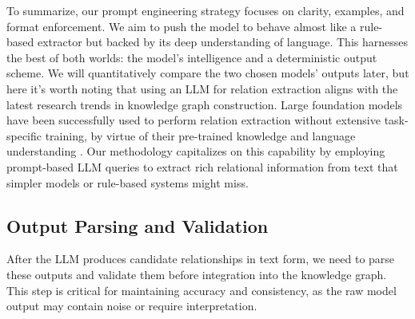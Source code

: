 To summarize, our prompt engineering strategy focuses on clarity, examples, and format enforcement. We aim to push the model to behave almost like a rule-based extractor but backed by its deep understanding of language. This harnesses the best of both worlds: the model's intelligence and a deterministic output scheme. We will quantitatively compare the two chosen models' outputs later, but here it's worth noting that using an LLM for relation extraction aligns with the latest research trends in knowledge graph construction. Large foundation models have been successfully used to perform relation extraction without extensive task-specific training, by virtue of their pre-trained knowledge and language understanding \parencite{Singhal2022}. Our methodology capitalizes on this capability by employing prompt-based LLM queries to extract rich relational information from text that simpler models or rule-based systems might miss.

\subsection{Output Parsing and Validation}
\label{sec:outputparsing}

After the LLM produces candidate relationships in text form, we need to parse these outputs and validate them before integration into the knowledge graph. This step is critical for maintaining accuracy and consistency, as the raw model output may contain noise or require interpretation.

